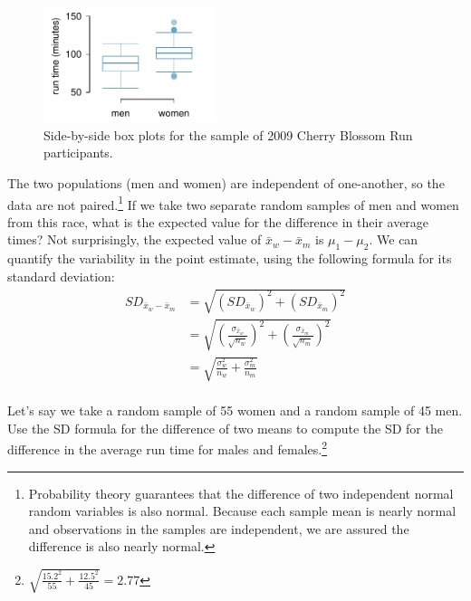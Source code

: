 \begin{figure}[h]
\centering
\includegraphics[width=0.45\textwidth]{ch_inference_for_means/figures/cbrRunTimesMenWomen/cbrRunTimesMenWomen}
\caption{Side-by-side box plots for the sample of 2009 Cherry Blossom Run participants.}
\label{cbrRunTimesMenWomen}
\end{figure}

The two populations (men and women) are independent of one-another, so the data are not paired.\footnote{Probability theory guarantees that the difference of two independent normal random variables is also normal. Because each sample mean is nearly normal and observations in the samples are independent, we are assured the difference is also nearly normal.} If we take two separate random samples of men and women from this race, what is the expected value for the difference in their average times? Not surprisingly, the expected value of $\bar{x}_{w} - \bar{x}_{m}$ is $\mu_1-\mu_2$. We can quantify the variability in the point estimate, using the following formula for its standard deviation:
\begin{align*}
SD_{\bar{x}_{w} - \bar{x}_{m}}
    &= \sqrt{\left(SD_{\bar{x}_{w}}\right)^2 +\left(SD_{\bar{x}_{m}}\right)^2 } \\
    &= \sqrt{\left(\frac{\sigma_{\bar{x}_{w}}}{\sqrt{n_w}}\right)^2 + \left(\frac{\sigma_{\bar{x}_{m}}}{\sqrt{n_m}}\right)^2 } \\
	&= \sqrt{\frac{\sigma_{w}^2}{n_{w}} + \frac{\sigma_{m}^2}{n_{m}}} \\
\end{align*}
\begin{exercise}
Let's say we take a random sample of 55 women and a random sample of 45 men. Use the SD formula for the difference of two means to compute the SD for the difference in the average run time for males and females.\footnote{$\sqrt{\frac{15.2^2}{55} + \frac{12.5^2}{45}} = 2.77$}
\end{exercise}

